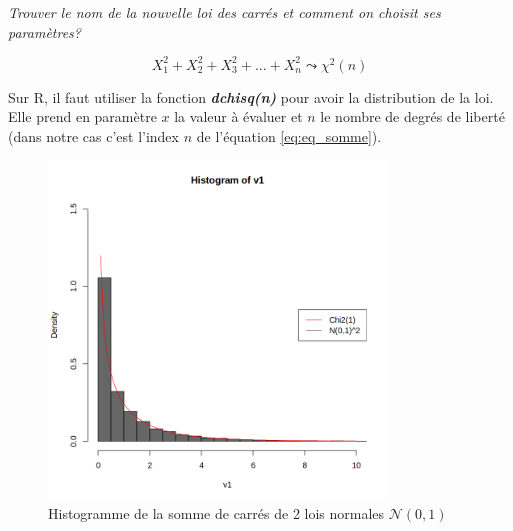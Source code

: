     \begin{center}
        \textit{Trouver le nom de la nouvelle loi des carrés et comment on choisit ses paramètres?}
    \end{center}
    \begin{equation}
        X_1^2+X_2^2+X_3^2+...+X_n^2\leadsto \chi^2(n)
        \label{eq:eq_somme}
    \end{equation}

    Sur R, il faut utiliser la fonction \textbf{\textit{dchisq(n)}} pour avoir la distribution de la loi. Elle prend en paramètre $x$ la valeur à évaluer et $n$ le nombre de degrés de liberté (dans notre cas c'est l'index $n$ de l'équation \ref{eq:eq_somme}).

    \begin{table}[H]
        \centering
        \begin{minipage}{0.28\textwidth}
            \centering
            \begin{figure}[H]
                \centering
                \includegraphics[width=0.80\textwidth]{4_attachments/figures/output41.png}
                \caption{Histogramme de la somme de carrés de 2 lois normales $\mathcal N(0,1)$}
                \label{fig:fig4}
            \end{figure}
         \end{minipage}
        \hfill
        \begin{minipage}{0.28\textwidth}
            \centering
            \begin{figure}[H]
                \centering

\end{figure}
\end{minipage}
\end{table}
